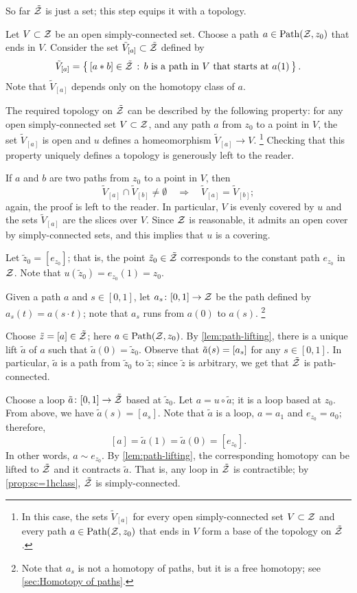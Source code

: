 So far $\tilde{\mathcal{Z}}$ is just a set; this step equips it with a topology.

Let $V\subset \mathcal{Z}$ be an open simply-connected set.
Choose a path $a\z\in\Path(\c{Z},z_0)$ that ends in $V$.
Consider the set $\tilde V_{[a]}\subset \tilde{\mathcal{Z}}$ defined by
\[\tilde V_{[a]}=\set{[a*b]\in\tilde{\c{Z}}}{b\ \text{is a path in}\ V\ \text{that starts at}\ a(1)}.\]
Note that $\tilde V_{[a]}$ depends only on the homotopy class of $a$.

The required topology on $\tilde{\mathcal{Z}}$ can be described by the following property:
for any open simply-connected set $V\subset \mathcal{Z}$, and any path $a$ from $z_0$ to a point in $V$,
the set $\tilde V_{[a]}$ is open and $u$ defines a homeomorphism $\tilde V_{[a]}\to V$.%
\footnote{In this case, the sets $\tilde V_{[a]}$ for every open simply-connected set $V\subset \mathcal{Z}$ and every path $a\in\mathrm{Path}(\mathcal{Z},z_0)$ that ends in $V$ form a base of the topology on $\tilde{\mathcal{Z}}$.}
Checking that this property uniquely defines a topology is generously left to the reader.

If $a$ and $b$ are two paths from $z_0$ to a point in $V$, then
\[\tilde V_{[a]}\cap\tilde V_{[b]}\ne\emptyset
\quad\Rightarrow\quad
\tilde V_{[a]}=\tilde V_{[b]};\]
again, the proof is left to the reader.
In particular, $V$ is evenly covered by $u$ and the sets $\tilde V_{[a]}$ are the slices over $V$.
Since $\mathcal{Z}$ is reasonable, it admits an open cover by simply-connected sets, and this implies that $u$ is a covering.

Let $\tilde z_0=[e_{z_0}]$; that is, the point $\tilde z_0\in \tilde{\mathcal{Z}}$ corresponds to the constant path $e_{z_0}$ in $\mathcal{Z}$.
Note that $u(\tilde z_0)=e_{z_0}(1)=z_0$.

Given a path $a$ and $s\in [0,1]$, let $a_s\colon[0,1]\to \mathcal{Z}$ be the path defined by $a_s(t)=a(s\cdot t)$;
note that $a_s$ runs from $a(0)$ to $a(s)$.%
\footnote{Note that $a_s$ is not a homotopy of paths, but it is a free homotopy; see \ref{sec:Homotopy of paths}.}

Choose $\tilde z=[a]\in \tilde{\mathcal{Z}}$; here $a\in\mathrm{Path}(\mathcal{Z},z_0)$.
By \ref{lem:path-lifting}, there is a unique lift $\tilde a$ of $a$ such that $\tilde a(0)=\tilde z_0$.
Observe that $\tilde a(s)\z= [a_s]$ for any $s\in[0,1]$.
In particular, $\tilde a$ is a path from $\tilde z_0$ to $\tilde z$;
since $\tilde z$ is arbitrary, we get that $\tilde{\mathcal{Z}}$ is path-connected.

Choose a loop $\tilde a\colon[0,1]\to \tilde{\mathcal{Z}}$ based at $\tilde z_0$.
Let $a=u\circ \tilde a$; it is a loop based at $z_0$.
From above, we have $\tilde a(s)= [a_s]$.
Note that $\tilde a$ is a loop, $a=a_1$ and $e_{z_0}=a_0$; therefore,
\[[a]=\tilde a(1)=\tilde a(0)=[e_{z_0}].\]
In other words, $a\sim e_{z_0}$.
By \ref{lem:path-lifting}, the corresponding homotopy can be lifted to $\tilde{\mathcal{Z}}$ and it contracts $\tilde a$.
That is, any loop in $\tilde{\mathcal{Z}}$ is contractible; by \ref{prop:sc=1hclass}, $\tilde{\mathcal{Z}}$ is simply-connected.
\qeds

